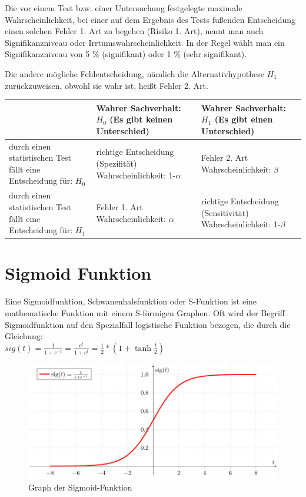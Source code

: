 Die vor einem Test bzw. einer Untersuchung festgelegte maximale Wahrscheinlichkeit, bei einer auf dem Ergebnis des Tests fußenden Entscheidung einen solchen Fehler 1. Art zu begehen (Risiko 1. Art), nennt man auch Signifikanzniveau oder Irrtumswahrscheinlichkeit. In der Regel wählt man ein Signifikanzniveau von 5 $\%$ (signifikant) oder 1 $\%$ (sehr signifikant).

Die andere mögliche Fehlentscheidung, nämlich die Alternativhypothese ${\displaystyle H_{1}}$ zurückzuweisen, obwohl sie wahr ist, heißt Fehler 2. Art.\\

\begin{table}[h!]
\begin{tabular}[t]{| p{4cm} | p{4cm} | p{4cm} |}
\hline \rule[3ex]{0pt}{5.5ex}  & \textbf{Wahrer Sachverhalt: $H_0$
(Es gibt keinen Unterschied)}  & \textbf{Wahrer Sachverhalt: $H_1$
(Es gibt einen Unterschied)} \\ 
\hline \rule[3ex]{0pt}{5.5ex} durch einen statistischen Test fällt eine Entscheidung für: $H_0$ & richtige Entscheidung (Spezifität)
Wahrscheinlichkeit: 1-$\alpha$ & Fehler 2. Art
Wahrscheinlichkeit: $\beta$ \\ 
\hline \rule[3ex]{0pt}{5.5ex} durch einen statistischen Test fällt eine Entscheidung für: $H_1$ & Fehler 1. Art
Wahrscheinlichkeit: $\alpha$ & richtige Entscheidung (Sensitivität)
Wahrscheinlichkeit: 1-$\beta$ \\ 
\hline 
\end{tabular}
\end{table}

\chapter{Sigmoid Funktion}
Eine Sigmoidfunktion, Schwanenhalsfunktion oder S-Funktion ist eine mathematische Funktion mit einem
S-förmigen Graphen.
Oft wird der Begriff Sigmoidfunktion auf den Spezialfall logistische Funktion bezogen,
die durch die Gleichung:\\
{\Large{$sig(t) = \frac{1}{1+e^{-t}} = \frac{e^t}{1 + e^t} = \frac{1}{2}*(1 + \tanh \frac{t}{2})$}}

\begin{figure}[h!]
\includegraphics[width=0.7\linewidth]{pics/Sigmoid}
\caption{Graph der Sigmoid-Funktion}
\label{fig:Sigmoid}
\end{figure}
